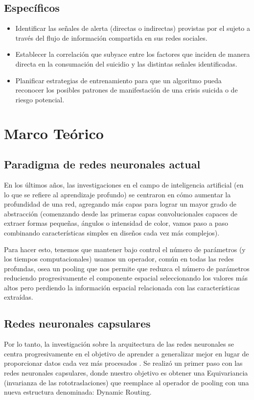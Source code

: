 \documentclass[12pt, man, donotrepeattitle, letterpaper]{apa6}
\begin{document}
    \subsection{Específicos}
    \begin{itemize}
        \item Identificar las señales de alerta (directas o indirectas) provistas por el sujeto a través del flujo de información compartida en sus redes sociales.
        \item Establecer la correlación que subyace entre los factores que inciden de manera directa en la consumación del suicidio y las distintas señales identificadas.
        \item Planificar estrategias de entrenamiento para que un algoritmo pueda reconocer los posibles patrones de manifestación de una crisis suicida o de riesgo potencial.
    \end{itemize}
    \newpage
    \section{Marco Teórico}
    
    \subsection{Paradigma de redes neuronales actual}
    En los últimos años, las investigaciones en el campo de inteligencia artificial (en lo que se refiere al aprendizaje profundo) se centraron en cómo aumentar la profundidad de una red, agregando más capas para lograr un mayor grado de abstracción (comenzando desde las primeras capas convolucionales capaces de extraer formas pequeñas, ángulos o intensidad de color, vamos paso a paso combinando características simples en diseños cada vez más complejos)\parencite{Capsules}.
    
    Para hacer esto, tenemos que mantener bajo control el número de parámetros (y los tiempos computacionales) usamos un operador, común en todas las redes profundas, osea un pooling que nos permite que reduzca el número de parámetros reduciendo progresivamente el componente espacial seleccionando los valores más altos pero perdiendo la información espacial relacionada con las características extraídas\parencite{Capsules2}.
    
    \subsection{Redes neuronales capsulares}
    Por lo tanto, la investigación sobre la arquitectura de las redes neuronales se centra progresivamente en el objetivo de aprender a generalizar mejor en lugar de proporcionar datos cada vez más procesados \parencite{Capsules3}. Se realizó un primer paso con las redes neuronales capsulares, donde nuestro objetivo es obtener una Equivariancia (invarianza de las rototraslaciones) que reemplace al operador de pooling con una nueva estructura denominada: Dynamic Routing.
    
\end{document}
